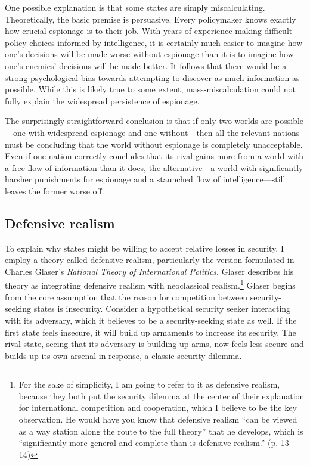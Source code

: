 \documentclass[14pt]{extarticle}
\begin{document}

One possible explanation is that some states are simply miscalculating. Theoretically, the basic premise is persuasive. Every policymaker knows exactly how crucial espionage is to their job. With years of experience making difficult policy choices informed by intelligence, it is certainly much easier to imagine how one's decisions will be made worse without espionage than it is to imagine how one's enemies' decisions will be made better. It follows that there would be a strong psychological bias towards attempting to discover as much information as possible. While this is likely true to some extent, mass-miscalculation could not fully explain the widespread persistence of espionage.

The surprisingly straightforward conclusion is that if only two worlds are possible---one with widespread espionage and one without---then all the relevant nations must be concluding that the world without espionage is completely unacceptable. Even if one nation correctly concludes that its rival gains more from a world with a free flow of information than it does, the alternative---a world with significantly harsher punishments for espionage and a staunched flow of intelligence---still leaves the former worse off.

\subsection{Defensive realism}
To explain why states might be willing to accept relative losses in security, I employ a theory called defensive realism, particularly the version formulated in Charles Glaser's \emph{Rational Theory of International Politics}. Glaser describes his theory as integrating defensive realism with neoclassical realism.\footnote{For the sake of simplicity, I am going to refer to it as defensive realism, because they both put the security dilemma at the center of their explanation for international competition and cooperation, which I believe to be the key observation. He would have you know that defensive realism \enquote{can be viewed as a way station along the route to the full theory} that he develops, which is \enquote{significantly more general and complete than is defensive realism.} (p. 13-14)} Glaser begins from the core assumption that the reason for competition between security-seeking states is insecurity. Consider a hypothetical security seeker interacting with its adversary, which it believes to be a security-seeking state as well. If the first state feels insecure, it will build up armaments to increase its security. The rival state, seeing that its adversary is building up arms, now feels less secure and builds up its own arsenal in response, a classic security dilemma.
\end{document}
